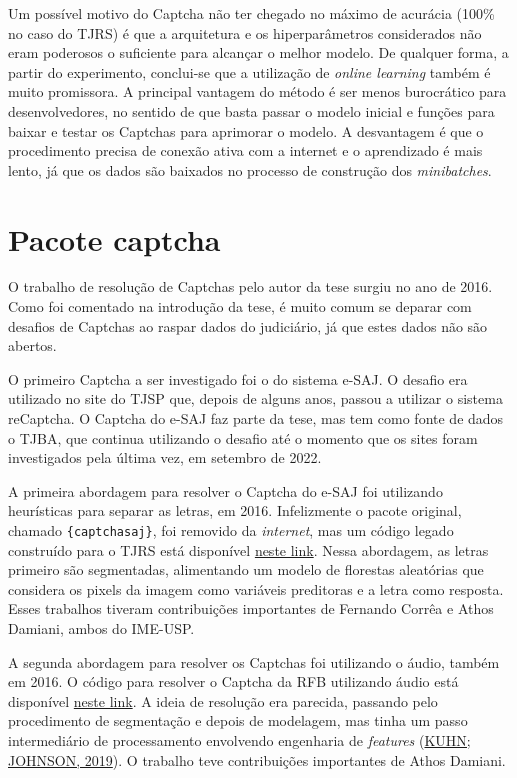 \documentclass[12pt,twoside,brazilian]{book}
\begin{document}
Um possível motivo do Captcha não ter chegado no máximo de acurácia
(100\% no caso do TJRS) é que a arquitetura e os hiperparâmetros
considerados não eram poderosos o suficiente para alcançar o melhor
modelo. De qualquer forma, a partir do experimento, conclui-se que a
utilização de \emph{online learning} também é muito promissora. A
principal vantagem do método é ser menos burocrático para
desenvolvedores, no sentido de que basta passar o modelo inicial e
funções para baixar e testar os Captchas para aprimorar o modelo. A
desvantagem é que o procedimento precisa de conexão ativa com a internet
e o aprendizado é mais lento, já que os dados são baixados no processo
de construção dos \emph{minibatches}.

\hypertarget{sec-pacote-captcha}{%
\section{Pacote captcha}\label{sec-pacote-captcha}}

O trabalho de resolução de Captchas pelo autor da tese surgiu no ano de
2016. Como foi comentado na introdução da tese, é muito comum se deparar
com desafios de Captchas ao raspar dados do judiciário, já que estes
dados não são abertos.

O primeiro Captcha a ser investigado foi o do sistema e-SAJ. O desafio
era utilizado no site do TJSP que, depois de alguns anos, passou a
utilizar o sistema reCaptcha. O Captcha do e-SAJ faz parte da tese, mas
tem como fonte de dados o TJBA, que continua utilizando o desafio até o
momento que os sites foram investigados pela última vez, em setembro de
2022.

A primeira abordagem para resolver o Captcha do e-SAJ foi utilizando
heurísticas para separar as letras, em 2016. Infelizmente o pacote
original, chamado \texttt{\{captchasaj\}}, foi removido da
\emph{internet}, mas um código legado construído para o TJRS está
disponível
\href{https://github.com/decryptr/captchaTJRS/blob/master/R/tools.R}{neste
link}. Nessa abordagem, as letras primeiro são segmentadas, alimentando
um modelo de florestas aleatórias que considera os pixels da imagem como
variáveis preditoras e a letra como resposta. Esses trabalhos tiveram
contribuições importantes de Fernando Corrêa e Athos Damiani, ambos do
IME-USP.

A segunda abordagem para resolver os Captchas foi utilizando o áudio,
também em 2016. O código para resolver o Captcha da RFB utilizando áudio
está disponível
\href{https://github.com/decryptr/captchaReceitaAudio}{neste link}. A
ideia de resolução era parecida, passando pelo procedimento de
segmentação e depois de modelagem, mas tinha um passo intermediário de
processamento envolvendo engenharia de \emph{features}
(\protect\hyperlink{ref-kuhn2019}{KUHN; JOHNSON, 2019}). O trabalho teve
contribuições importantes de Athos Damiani.
\end{document}
